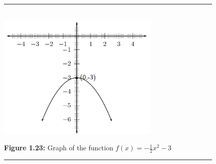 	\begin{figure}[H] %
    \begin{center}
    \rule[.1in]{\figurerulewidth}{.005in} \\
        \label{m39345*uid129!!!underscore!!!media}\label{m39345*uid129!!!underscore!!!printimage}\includegraphics[width=300px]{col11306.imgs/m39345_MG10C11_019.png} %
      \vspace{2pt}
    \vspace{\rubberspace}\par \begin{cnxcaption}
	  \small \textbf{Figure 1.23: }Graph of the function $f\left(x\right)=-\frac{1}{2}{x}^{2}-3$
	\end{cnxcaption}
    \vspace{.1in}
    \rule[.1in]{\figurerulewidth}{.005in} \\
    \end{center}
 \end{figure}       
\par
            \label{m39345*eid7523}\vspace{.5cm} 
      \noindent
